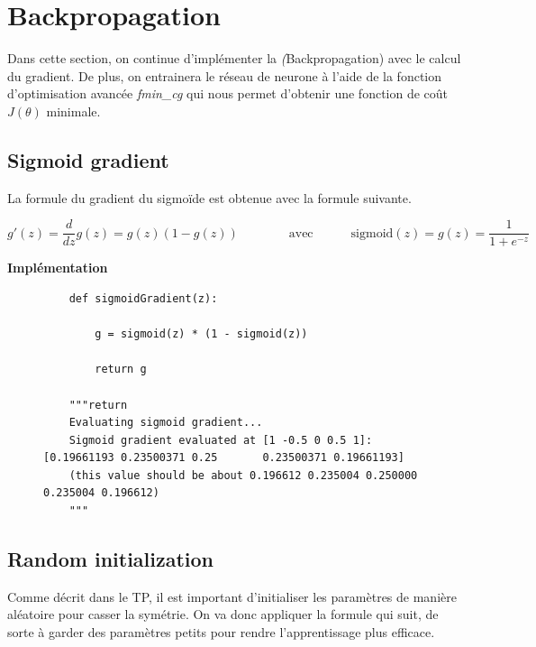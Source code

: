 \clearpage
\section{Backpropagation}

Dans cette section, on continue d'implémenter la \textit(Backpropagation) avec le calcul du gradient.
De plus, on entrainera le réseau de neurone à l'aide de la fonction d'optimisation avancée 
\textit{fmin\_cg} qui nous permet d'obtenir une fonction de coût $J(\theta)$ minimale. 


\subsection{Sigmoid gradient}

La formule du gradient du sigmoïde est obtenue avec la formule suivante.

\begin{equation}
    g'(z) = \frac{d}{dz}g(z) = g(z)(1 - g(z)) \qquad \qquad \text{avec} \quad \qquad \text{sigmoid}(z) = g(z) = \frac{1}{1 + e^{-z}}
\end{equation}

\noindent
\textbf{Implémentation}

\begin{figure}[!h]
    \begin{verbatim}
    def sigmoidGradient(z):

        g = sigmoid(z) * (1 - sigmoid(z))
        
        return g

    """return 
    Evaluating sigmoid gradient...
    Sigmoid gradient evaluated at [1 -0.5 0 0.5 1]:[0.19661193 0.23500371 0.25       0.23500371 0.19661193]
    (this value should be about 0.196612 0.235004 0.250000 0.235004 0.196612)       
    """
    \end{verbatim}   
\end{figure}

\subsection{Random initialization}

Comme décrit dans le TP, il est important d'initialiser 
les paramètres de manière aléatoire pour casser la symétrie. On va donc appliquer la formule qui suit, 
de sorte à garder des paramètres petits pour rendre l'apprentissage plus efficace. 

